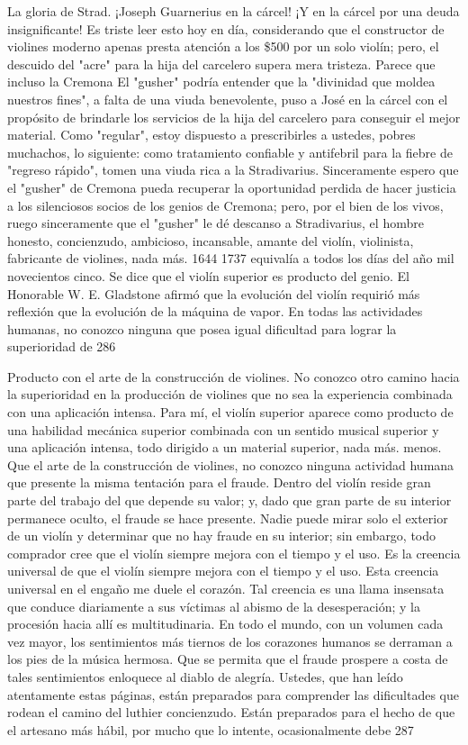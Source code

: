 La gloria de Strad.
¡Joseph Guarnerius en la cárcel!
¡Y en la cárcel por una deuda insignificante! Es triste leer esto hoy en día, considerando que el constructor de violines moderno apenas presta atención a los \$500 por un solo violín; pero, el descuido del "acre" para la hija del carcelero supera
mera tristeza. Parece que incluso la Cremona
El "gusher" podría entender que la "divinidad que moldea nuestros fines", a falta de una viuda benevolente, puso a José en la cárcel con el propósito de brindarle los servicios de la hija del carcelero para conseguir el mejor material. Como "regular", estoy dispuesto a prescribirles a ustedes, pobres muchachos, lo siguiente: como tratamiento confiable y antifebril para la fiebre de "regreso rápido", tomen una viuda rica a la Stradivarius. Sinceramente espero que el "gusher" de Cremona pueda recuperar la oportunidad perdida de hacer justicia a los silenciosos socios de los genios de Cremona; pero, por el bien de los vivos, ruego sinceramente que el "gusher" le dé descanso a Stradivarius, el hombre honesto, concienzudo, ambicioso, incansable, amante del violín, violinista, fabricante de violines, nada más. 1644
1737 equivalía a todos los días del año mil novecientos cinco.
Se dice que el violín superior es producto del genio. El Honorable W. E. Gladstone afirmó que la evolución del violín requirió más reflexión que la evolución de la máquina de vapor.
En todas las actividades humanas, no conozco ninguna que posea igual dificultad para lograr la superioridad de
286

Producto con el arte de la construcción de violines. No conozco otro camino hacia la superioridad en la producción de violines que no sea la experiencia combinada con una aplicación intensa. Para mí, el violín superior aparece como producto de una habilidad mecánica superior combinada con un sentido musical superior y una aplicación intensa, todo dirigido a un material superior, nada más.
menos.
Que el arte de la construcción de violines, no conozco ninguna actividad humana que presente la misma tentación para el fraude. Dentro del violín reside gran parte del trabajo del que depende su valor; y, dado que gran parte de su interior permanece oculto, el fraude se hace presente. Nadie puede mirar solo el exterior de un violín y determinar que no hay fraude en su interior; sin embargo, todo comprador cree que el violín siempre mejora con el tiempo y el uso. Es la creencia universal de que el violín siempre mejora con el tiempo y el uso. Esta creencia universal en el engaño me duele el corazón. Tal creencia es una llama insensata que conduce diariamente a sus víctimas al abismo de la desesperación; y la procesión hacia allí es multitudinaria. En todo el mundo, con un volumen cada vez mayor, los sentimientos más tiernos de los corazones humanos se derraman a los pies de la música hermosa. Que se permita que el fraude prospere a costa de tales sentimientos enloquece al diablo de alegría.
Ustedes, que han leído atentamente estas páginas, están preparados para comprender las dificultades que rodean el camino del luthier concienzudo. Están preparados para el hecho de que el artesano más hábil, por mucho que lo intente, ocasionalmente debe
287


